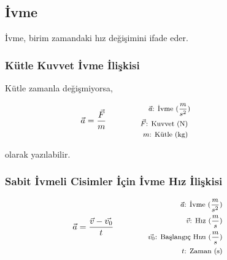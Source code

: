 \subsection{İvme}

İvme, birim zamandaki hız değişimini ifade eder.

\subsubsection*{Kütle Kuvvet İvme İlişkisi}

Kütle zamanla değişmiyorsa,

\begin{equation}
    \vec{a} = \frac{\vec{F}}{m} \qquad \qquad \parbox{4cm}{\footnotesize$\begin{aligned}
        \vec{a}\text{: İvme } (\frac{m}{s^2}) \\
        \vec{F}\text{: Kuvvet (N) } \\
        m\text{: Kütle (kg) }
    \end{aligned}$}
\end{equation}

olarak yazılabilir.

\subsubsection*{Sabit İvmeli Cisimler İçin İvme Hız İlişkisi}
\begin{equation}
    \vec{a} = \frac{\vec{v} - \vec{v_0}}{t} \qquad \qquad \parbox{4cm}{\footnotesize$\begin{aligned}
        \vec{a}\text{: İvme } (\frac{m}{s^2}) \\
        \vec{v}\text{: Hız } (\frac{m}{s}) \\
        \vec{v_0}\text{: Başlangıç Hızı } (\frac{m}{s}) \\
        t\text{: Zaman (s)}
\end{aligned}$}
\end{equation}
